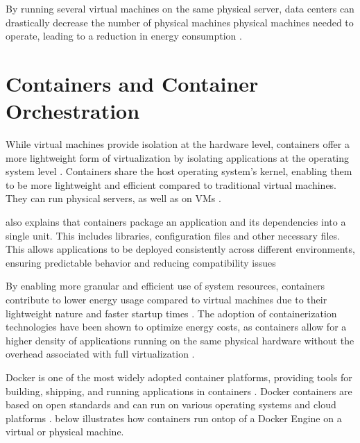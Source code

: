 \documentclass[
  table]{report}
\begin{document}
By running several virtual machines on the same physical server, data
centers can drastically decrease the number of physical machines
physical machines needed to operate, leading to a reduction in energy
consumption \citep{kaplanRevolutionizingDataCenter2008}.

\section{Containers and Container Orchestration}
\label{sect:containers}

While virtual machines provide isolation at the hardware level,
containers offer a more lightweight form of virtualization by isolating
applications at the operating system level
\citep{merkelDockerLightweightLinux2014}. Containers share the host
operating system's kernel, enabling them to be more lightweight and
efficient compared to traditional virtual machines. They can run
physical servers, as well as on \ac{VMs}
\citep{bernsteinContainersCloudLXC2014}.

\citet{merkelDockerLightweightLinux2014} also explains that containers
package an application and its dependencies into a single unit. This
includes libraries, configuration files and other necessary files. This
allows applications to be deployed consistently across different
environments, ensuring predictable behavior and reducing compatibility
issues \citep{sergeevDockerContainerPerformance2022}

By enabling more granular and efficient use of system resources,
containers contribute to lower energy usage compared to virtual machines
due to their lightweight nature and faster startup times
\citep{shirinbabPerformanceEvaluationContainers2020}. The adoption of
containerization technologies have been shown to optimize energy costs,
as containers allow for a higher density of applications running on the
same physical hardware without the overhead associated with full
virtualization
\citep{cuadrado-corderoComparativeExperimentalAnalysis2018}.

Docker is one of the most widely adopted container platforms, providing
tools for building, shipping, and running applications in containers
\citep{merkelDockerLightweightLinux2014}. Docker containers are based on
open standards and can run on various operating systems and cloud
platforms \citep{sergeevDockerContainerPerformance2022}.
 below illustrates how containers run ontop of a
Docker Engine on a virtual or physical machine.
\end{document}
